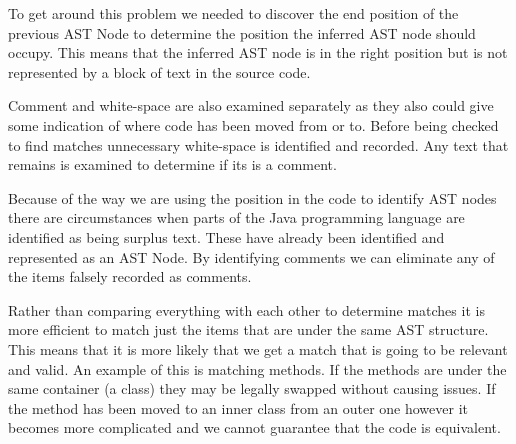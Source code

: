To get around this problem we needed to discover the end position of the previous AST Node to determine the position the inferred AST node should occupy.  This means that the inferred AST node is in the right position but is not represented by a block of text in the source code. 

Comment and white-space are also examined separately as they also could give some indication of where code has been moved from or to.
Before being checked to find matches unnecessary white-space is identified and recorded.
Any text that remains is examined to determine if its is a comment. 

Because of the way we are using the position in the code to identify AST nodes there are circumstances when parts of the Java programming language are identified as being surplus text. These have already been identified and represented as an AST Node. By identifying comments we can eliminate any of the items falsely recorded as comments.


% 
% 

Rather than comparing everything with each other to determine matches it is more efficient to match just the items that are under the same AST structure.  This means that it is more likely that we get a match that is going to be relevant and valid.  An example of this is matching methods. If the methods are under the same container (a class) they may be legally swapped without causing issues.  If the method has been moved to an inner class from an outer one however it becomes more complicated and we cannot guarantee that the code is equivalent.  


